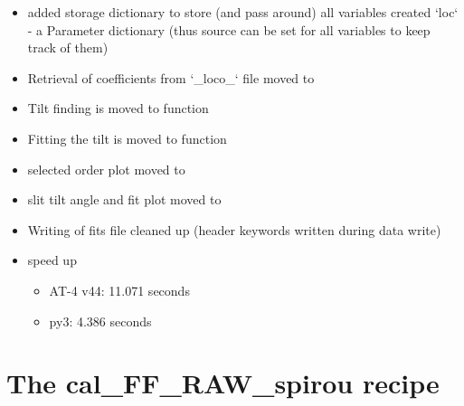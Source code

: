\begin{itemize}
\item added storage dictionary to store (and pass around) all variables created `loc` - a Parameter dictionary (thus source can be set for all variables to keep track of them)

\item Retrieval of coefficients from `\_loco\_` file moved to 

\item Tilt finding is moved to function 

\item Fitting the tilt is moved to function 

\item selected order plot moved to 

\item slit tilt angle and fit plot moved to 

\item Writing of fits file cleaned up (header keywords written during data write)

\item speed up
	\begin{itemize}
	\item AT-4 v44: 11.071 seconds
	\item py3: 4.386 seconds
    \end{itemize}

\end{itemize}

\section{The cal\_FF\_RAW\_spirou recipe}
\label{ch:changelog:At4:cal_FF_RAW_spirou}

